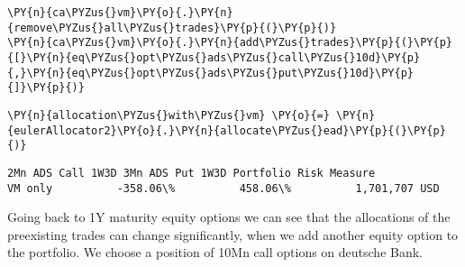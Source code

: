     \begin{tcolorbox}[breakable, size=fbox, boxrule=1pt, pad at break*=1mm,colback=cellbackground, colframe=cellborder]
\begin{Verbatim}[commandchars=\\\{\}]
\PY{n}{ca\PYZus{}vm}\PY{o}{.}\PY{n}{remove\PYZus{}all\PYZus{}trades}\PY{p}{(}\PY{p}{)}
\PY{n}{ca\PYZus{}vm}\PY{o}{.}\PY{n}{add\PYZus{}trades}\PY{p}{(}\PY{p}{[}\PY{n}{eq\PYZus{}opt\PYZus{}ads\PYZus{}call\PYZus{}10d}\PY{p}{,}\PY{n}{eq\PYZus{}opt\PYZus{}ads\PYZus{}put\PYZus{}10d}\PY{p}{]}\PY{p}{)}
\end{Verbatim}
\end{tcolorbox}

    \begin{tcolorbox}[breakable, size=fbox, boxrule=1pt, pad at break*=1mm,colback=cellbackground, colframe=cellborder]
\begin{Verbatim}[commandchars=\\\{\}]
\PY{n}{allocation\PYZus{}with\PYZus{}vm} \PY{o}{=} \PY{n}{eulerAllocator2}\PY{o}{.}\PY{n}{allocate\PYZus{}ead}\PY{p}{(}\PY{p}{)}
\end{Verbatim}
\end{tcolorbox}

            \begin{tcolorbox}[breakable, size=fbox, boxrule=.5pt, pad at break*=1mm, opacityfill=0]
\begin{Verbatim}[commandchars=\\\{\}]
        2Mn ADS Call 1W3D 3Mn ADS Put 1W3D Portfolio Risk Measure
VM only          -358.06\%          458.06\%          1,701,707 USD
\end{Verbatim}
\end{tcolorbox}
        
    Going back to 1Y maturity equity options we can see that the allocations
of the preexisting trades can change significantly, when we add another
equity option to the portfolio. We choose a position of 10Mn call
options on deutsche Bank.


